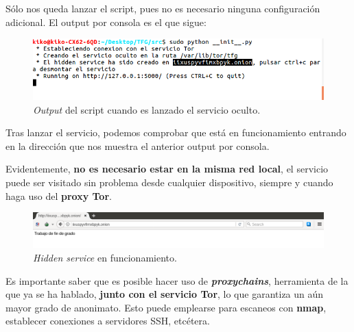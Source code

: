 Sólo nos queda lanzar el script, pues no es necesario ninguna configuración adicional. El output por consola es el que sigue:

\begin{figure}[h]
	\centerline{
		\mbox{\includegraphics[width=5.00in]{images/hs_running.png}}
	}
	\caption{\textit{Output} del script cuando es lanzado el servicio oculto.}
	\label{fig:norm_Daugman}
\end{figure}

Tras lanzar el servicio, podemos comprobar que está en funcionamiento entrando en la dirección que nos muestra el anterior output por consola. 

Evidentemente, \textbf{no es necesario estar en la misma red local}, el servicio puede ser visitado sin problema desde cualquier dispositivo, siempre y cuando haga uso del \textbf{proxy Tor}.

\begin{figure}[h]
	\centerline{
		\mbox{\includegraphics[width=5.00in]{images/hs_running2.png}}
	}
	\caption{\textit{Hidden service} en funcionamiento.}
	\label{fig:norm_Daugman}
\end{figure} 


Es importante saber que es posible hacer uso de \textbf{\textit{proxychains}}, herramienta de la que ya se ha hablado, \textbf{junto con el servicio Tor}, lo que garantiza un aún mayor grado de anonimato. Esto puede emplearse para escaneos con \textbf{nmap}, establecer conexiones a servidores SSH, etcétera.

